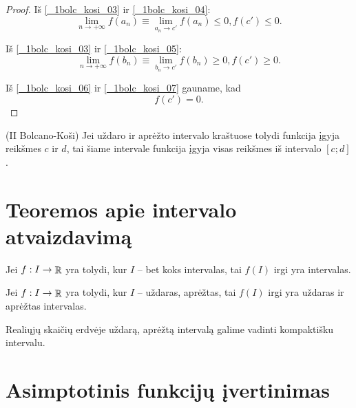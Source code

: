 \begin{prop}
\begin{proof}
    Iš \ref{_1bolc_kosi_03} ir \ref{_1bolc_kosi_04}:
    \begin{equation}
      \lim _{n \to +\infty} f(a_{n}) 
        \equiv \lim _{a_{n} \to c'} f(a_{n}) \leq 0,
        f(c') \leq 0.
      \label{_1bolc_kosi_06}
    \end{equation}

    Iš \ref{_1bolc_kosi_03} ir \ref{_1bolc_kosi_05}:
    \begin{equation}
      \lim _{n \to +\infty} f(b_{n}) 
        \equiv \lim _{b_{n} \to c'} f(b_{n}) \geq 0,
        f(c') \geq 0.
      \label{_1bolc_kosi_07}
    \end{equation}

    Iš \ref{_1bolc_kosi_06} ir \ref{_1bolc_kosi_07} gauname, kad
    \begin{equation*}
      f(c') = 0.
    \end{equation*}
  \end{proof}
\end{prop}

\begin{prop}
  (II Bolcano-Koši) Jei uždaro ir aprėžto intervalo kraštuose tolydi
  funkcija įgyja reikšmes $c$ ir $d$, tai šiame intervale funkcija įgyja
  visas reikšmes iš intervalo $[c; d]$.
\end{prop}

\section{Teoremos apie intervalo atvaizdavimą}

\begin{prop}
  Jei $f : I \to \mathop{\mathbb{R}}$ yra tolydi, kur $I$ – bet koks intervalas, tai
  $f(I)$ irgi yra intervalas.
\end{prop}

\begin{prop}
  Jei $f : I \to \mathop{\mathbb{R}}$ yra tolydi, kur $I$ – uždaras, aprėžtas, tai 
  $f(I)$ irgi yra uždaras ir aprėžtas intervalas.
\end{prop}

\begin{note}
  Realiųjų skaičių erdvėje uždarą, aprėžtą intervalą galime vadinti
  kompaktišku intervalu.
\end{note}

\section{Asimptotinis funkcijų įvertinimas}

